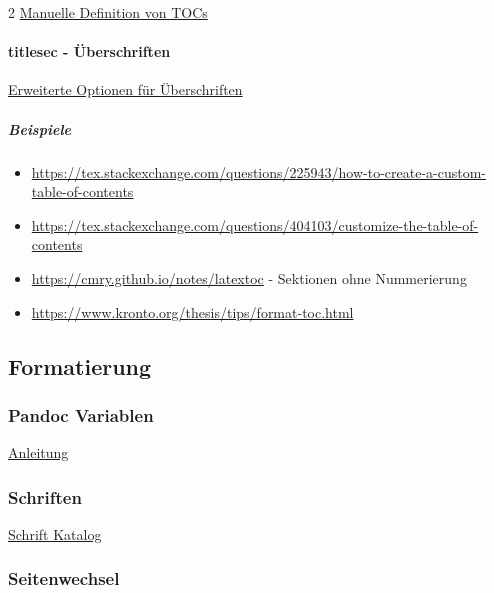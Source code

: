 \documentclass[
  a4paper,
  twoside]{article}
\providecommand{\tightlist}{%
  \setlength{\itemsep}{0pt}\setlength{\parskip}{0pt}}
\let\oldparagraph\paragraph
\renewcommand{\paragraph}[1]{\oldparagraph{#1}\mbox{}}
\let\oldsubparagraph\subparagraph
\renewcommand{\subparagraph}[1]{\oldsubparagraph{#1}\mbox{}}
\begin{document}
\begin {multicols}{2}
\href{https://ctan.org/pkg/enumitem?lang=de}{Manuelle Definition von TOCs}

\hypertarget{titlesec---uxfcberschriften}{%
\paragraph{titlesec - Überschriften}\label{titlesec---uxfcberschriften}}

\href{https://ctan.org/pkg/titlesec?lang=de}{Erweiterte Optionen für Überschriften}

\hypertarget{beispiele}{%
\subparagraph{Beispiele}\label{beispiele}}

\begin{itemize}
\tightlist
\item
  \url{https://tex.stackexchange.com/questions/225943/how-to-create-a-custom-table-of-contents}
\item
  \url{https://tex.stackexchange.com/questions/404103/customize-the-table-of-contents}
\item
  \url{https://cmry.github.io/notes/latextoc} - Sektionen ohne Nummerierung
\item
  \url{https://www.kronto.org/thesis/tips/format-toc.html}
\end{itemize}

\end {multicols}

\newpage

\hypertarget{formatierung}{%
\subsection{Formatierung}\label{formatierung}}

\hypertarget{pandoc-variablen}{%
\subsubsection{Pandoc Variablen}\label{pandoc-variablen}}

\href{https://pandoc.org/MANUAL.html\#variables-for-latex}{Anleitung}

\hypertarget{schriften}{%
\subsubsection{Schriften}\label{schriften}}

\href{https://tug.org/FontCatalogue/}{Schrift Katalog}

\hypertarget{seitenwechsel}{%
\subsubsection{Seitenwechsel}\label{seitenwechsel}}
\end{document}
